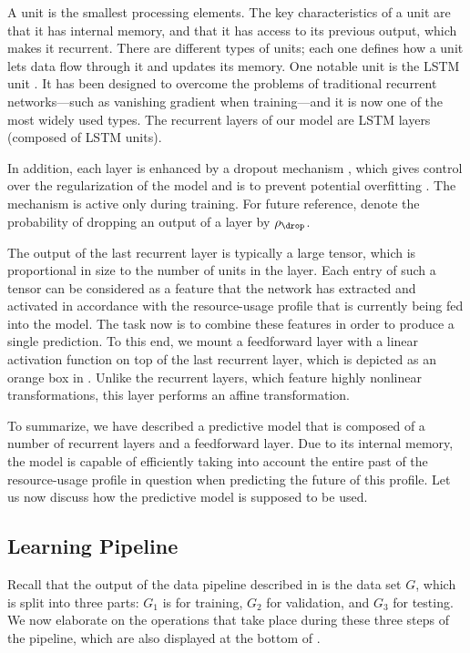 A unit is the smallest processing elements. The key characteristics of a unit
are that it has internal memory, and that it has access to its previous output,
which makes it recurrent. There are different types of units; each one defines
how a unit lets data flow through it and updates its memory. One notable unit is
the \ac{LSTM} unit \cite{hochreiter1997}. It has been designed to overcome the
problems of traditional recurrent networks---such as vanishing gradient when
training---and it is now one of the most widely used types. The recurrent layers
of our model are \ac{LSTM} layers (composed of \ac{LSTM} units).

In addition, each layer is enhanced by a dropout mechanism \cite{zaremba2014},
which gives control over the regularization of the model and is to prevent
potential overfitting \cite{hastie2013}. The mechanism is active only during
training. For future reference, denote the probability of dropping an output of
a layer by $\rho_\drop$.

The output of the last recurrent layer is typically a large tensor, which is
proportional in size to the number of units in the layer. Each entry of such a
tensor can be considered as a feature that the network has extracted and
activated in accordance with the resource-usage profile that is currently being
fed into the model. The task now is to combine these features in order to
produce a single prediction. To this end, we mount a feedforward layer with a
linear activation function on top of the last recurrent layer, which is depicted
as an orange box in . Unlike the recurrent layers,
which feature highly nonlinear transformations, this layer performs an affine
transformation.

To summarize, we have described a predictive model that is composed of a number
of recurrent layers and a feedforward layer. Due to its internal memory, the
model is capable of efficiently taking into account the entire past of the
resource-usage profile in question when predicting the future of this profile.
Let us now discuss how the predictive model is supposed to be used.

\subsection{Learning Pipeline}

Recall that the output of the data pipeline described in
 is the data set $G$, which is split into three parts:
$G_1$ is for training, $G_2$ for validation, and $G_3$ for testing. We now
elaborate on the operations that take place during these three steps of the
pipeline, which are also displayed at the bottom of .


